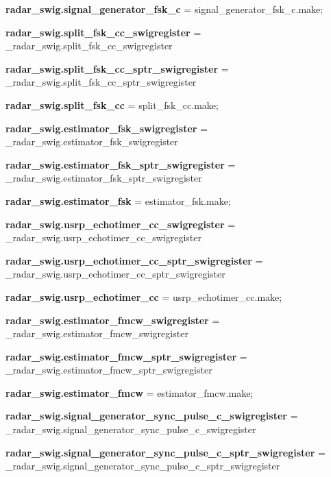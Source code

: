 \begin{DoxyCompactItemize}
\item 
{\bf radar\+\_\+swig.\+signal\+\_\+generator\+\_\+fsk\+\_\+c} = signal\+\_\+generator\+\_\+fsk\+\_\+c.\+make;
\item 
{\bf radar\+\_\+swig.\+split\+\_\+fsk\+\_\+cc\+\_\+swigregister} = \+\_\+radar\+\_\+swig.\+split\+\_\+fsk\+\_\+cc\+\_\+swigregister
\item 
{\bf radar\+\_\+swig.\+split\+\_\+fsk\+\_\+cc\+\_\+sptr\+\_\+swigregister} = \+\_\+radar\+\_\+swig.\+split\+\_\+fsk\+\_\+cc\+\_\+sptr\+\_\+swigregister
\item 
{\bf radar\+\_\+swig.\+split\+\_\+fsk\+\_\+cc} = split\+\_\+fsk\+\_\+cc.\+make;
\item 
{\bf radar\+\_\+swig.\+estimator\+\_\+fsk\+\_\+swigregister} = \+\_\+radar\+\_\+swig.\+estimator\+\_\+fsk\+\_\+swigregister
\item 
{\bf radar\+\_\+swig.\+estimator\+\_\+fsk\+\_\+sptr\+\_\+swigregister} = \+\_\+radar\+\_\+swig.\+estimator\+\_\+fsk\+\_\+sptr\+\_\+swigregister
\item 
{\bf radar\+\_\+swig.\+estimator\+\_\+fsk} = estimator\+\_\+fsk.\+make;
\item 
{\bf radar\+\_\+swig.\+usrp\+\_\+echotimer\+\_\+cc\+\_\+swigregister} = \+\_\+radar\+\_\+swig.\+usrp\+\_\+echotimer\+\_\+cc\+\_\+swigregister
\item 
{\bf radar\+\_\+swig.\+usrp\+\_\+echotimer\+\_\+cc\+\_\+sptr\+\_\+swigregister} = \+\_\+radar\+\_\+swig.\+usrp\+\_\+echotimer\+\_\+cc\+\_\+sptr\+\_\+swigregister
\item 
{\bf radar\+\_\+swig.\+usrp\+\_\+echotimer\+\_\+cc} = usrp\+\_\+echotimer\+\_\+cc.\+make;
\item 
{\bf radar\+\_\+swig.\+estimator\+\_\+fmcw\+\_\+swigregister} = \+\_\+radar\+\_\+swig.\+estimator\+\_\+fmcw\+\_\+swigregister
\item 
{\bf radar\+\_\+swig.\+estimator\+\_\+fmcw\+\_\+sptr\+\_\+swigregister} = \+\_\+radar\+\_\+swig.\+estimator\+\_\+fmcw\+\_\+sptr\+\_\+swigregister
\item 
{\bf radar\+\_\+swig.\+estimator\+\_\+fmcw} = estimator\+\_\+fmcw.\+make;
\item 
{\bf radar\+\_\+swig.\+signal\+\_\+generator\+\_\+sync\+\_\+pulse\+\_\+c\+\_\+swigregister} = \+\_\+radar\+\_\+swig.\+signal\+\_\+generator\+\_\+sync\+\_\+pulse\+\_\+c\+\_\+swigregister
\item 
{\bf radar\+\_\+swig.\+signal\+\_\+generator\+\_\+sync\+\_\+pulse\+\_\+c\+\_\+sptr\+\_\+swigregister} = \+\_\+radar\+\_\+swig.\+signal\+\_\+generator\+\_\+sync\+\_\+pulse\+\_\+c\+\_\+sptr\+\_\+swigregister

\end{DoxyCompactItemize}
